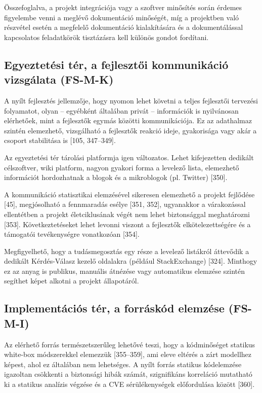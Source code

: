 \documentclass[12pt,magyar,a4paper,oneside]{scrreprt}
\begin{document}
Összefoglalva, a projekt integrációja vagy a szoftver minősítés során
érdemes figyelembe venni a meglévő dokumentáció minőségét, míg a
projektben való részvétel esetén a megfelelő dokumentáció kialakítására
és a dokumentálással kapcsolatos feladatkörök tisztázásra kell különös
gondot fordítani.

\hypertarget{sec:FS-M-K}{%
\subsection{Egyeztetési tér, a fejlesztői kommunikáció vizsgálata
(FS-M-K)}\label{sec:FS-M-K}}

A nyílt fejlesztés jellemzője, hogy nyomon lehet követni a teljes
fejlesztői tervezési folyamatot, olyan -- egyébként általában privát --
információk is nyilvánosan elérhetőek, mint a fejlesztők egymás közötti
kommunikációja. Ez az adathalmaz szintén elemezhető, vizsgálható a
fejlesztők reakció ideje, gyakorisága vagy akár a csoport stabilitása is
{[}105, 347--349{]}.

Az egyeztetési tér tárolási platformja igen változatos. Lehet
kifejezetten dedikált célszoftver, wiki platform, nagyon gyakori forma a
levelező lista, elemezhető információt hordozhatnak a blogok és a
mikroblogok (pl. Twitter) {[}350{]}.

A kommunikáció statisztikai elemzésével sikeresen elemezhető a projekt
fejlődése {[}45{]}, megjósolható a fennmaradás esélye {[}351, 352{]},
ugyanakkor a várakozással ellentétben a projekt életciklusának végét nem
lehet biztonsággal meghatározni {[}353{]}. Következtetéseket lehet
levonni viszont a fejlesztők elkötelezettségére és a támogatói
tevékenységre vonatkozóan {[}354{]}.

Megfigyelhető, hogy a tudásmegosztás egy része a levelező listákról
áttevődik a dedikált Kérdés-Válasz kezelő oldalakra (például
StackExchange) {[}324{]}. Minthogy ez az anyag is publikus, manuális
átnézése vagy automatikus elemzése szintén segíthet képet alkotni a
projekt állapotáról.

\hypertarget{sec:FS-M-I}{%
\subsection{Implementációs tér, a forráskód elemzése
(FS-M-I)}\label{sec:FS-M-I}}

Az elérhető forrás természetszerűleg lehetővé teszi, hogy a kódminőséget
statikus white-box módszerekkel elemezzük {[}355--359{]}, ami eleve
eltérés a zárt modellhez képest, ahol ez általában nem lehetséges. A
nyílt forrás statikus kódelemzése igazoltan csökkenti a biztonsági hibák
számát, szignifikáns korreláció mutatható ki a statikus analízis végzése
és a CVE sérülékenységek előfordulása között {[}360{]}.
\end{document}
